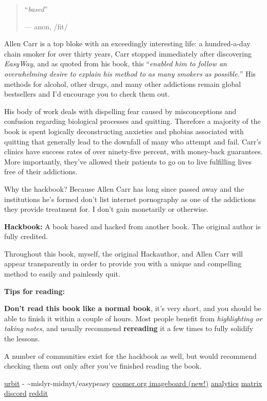 \documentclass[
]{book}
\begin{document}
\begin{quote}
``\emph{based}''

--- anon, /fit/
\end{quote}

Allen Carr is a top bloke with an exceedingly interesting life: a hundred-a-day chain smoker for over thirty years, Carr stopped immediately after discovering \emph{EasyWay}, and as quoted from his book, this ``\emph{enabled him to follow an overwhelming desire to explain his method to as many smokers as possible.}'' His methods for alcohol, other drugs, and many other addictions remain global bestsellers and I'd encourage you to check them out.

His body of work deals with dispelling fear caused by misconceptions and confusion regarding biological processes and quitting. Therefore a majority of the book is spent logically deconstructing anxieties and phobias associated with quitting that generally lead to the downfall of many who attempt and fail. Carr's clinics have success rates of over ninety-five percent, with money-back guarantees. More importantly, they've allowed their patients to go on to live fulfilling lives free of their addictions.

Why the hackbook? Because Allen Carr has long since passed away and the institutions he's formed don't list internet pornography as one of the addictions they provide treatment for. I don't gain monetarily or otherwise.

{\textbf{Hackbook:} A book based and hacked from another book. The original author is fully credited. }

Throughout this book, myself, the original Hackauthor, and Allen Carr will appear transparently in order to provide you with a unique and compelling method to easily and painlessly quit.

{\textbf{Tips for reading:}}

\textbf{Don't read this book like a normal book}, it's very short, and you should be able to finish it within a couple of hours. Most people benefit from \emph{highlighting or taking notes}, and usually recommend \textbf{rereading} it a few times to fully solidify the lessons.

A number of communities exist for the hackbook as well, but would recommend checking them out only after you've finished reading the book.

\href{https://urbit.org}{urbit} - \textasciitilde mislyr-midnyt/easypeasy \textbar{} \href{https://coomer.org}{coomer.org imageboard (new!)} \textbar{} \href{https://plausible.io/easypeasymethod.org}{analytics} \textbar{} \href{https://matrix.to/\#/!xmJZznbJXuwzEGSEti:matrix.org?via=matrix.org}{matrix} \textbar{} \href{https://discord.com/invite/bCXEnf9}{discord} \textbar{} \href{https://reddit.com/r/pmohackbook}{reddit}
\end{document}
